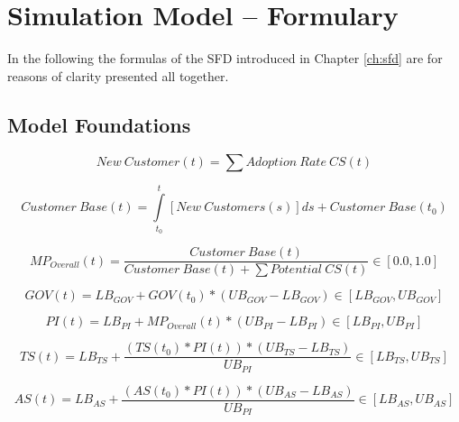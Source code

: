 \chapter{Simulation Model -- Formulary}\label{ch:app04}

In the following the formulas of the \ac{SFD} introduced in Chapter \ref{ch:sfd} are for reasons of clarity presented all together.

\section{Model Foundations}\label{ch:app04:mf}

\begin{equation}
	\mathit{New~Customer(t)} = \sum{\mathit{Adoption~Rate~CS(t)}}
\end{equation}

\begin{equation}
	\mathit{Customer~Base(t)} = \int\limits_{t_0}^t \mathit{[New~Customers(s)]ds} + \mathit{Customer~Base(t_0)}
\end{equation}

\begin{equation}
	MP_{Overall}(t) = \frac{\mathit{Customer~Base(t)}}{\mathit{Customer~Base(t)} + \sum \mathit{Potential~CS(t)}} \in [0.0,1.0]
\end{equation}

\begin{equation}
	GOV(t) = LB_{GOV} + GOV(t_0) * (UB_{GOV} - LB_{GOV}) \in [LB_{GOV},UB_{GOV}]
\end{equation}

\begin{equation}
	PI(t) = LB_{PI} + MP_{Overall}(t) * (UB_{PI} - LB_{PI}) \in [LB_{PI},UB_{PI}]
\end{equation}

\begin{equation}
	TS(t) = LB_{TS} +  \frac{(TS(t_0) * PI(t)) * (UB_{TS} - LB_{TS})}{UB_{PI}} \in [LB_{TS},UB_{TS}]
\end{equation}

\begin{equation}
	AS(t) = LB_{AS} +  \frac{(AS(t_0) * PI(t)) * (UB_{AS} - LB_{AS})}{UB_{PI}} \in [LB_{AS},UB_{AS}]
\end{equation}


